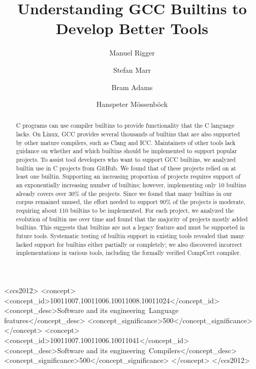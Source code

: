 \documentclass[sigconf,screen]{acmart}
\newcommand\tenbuiltinssupportapproxpercprojects{30\%} %
\begin{document}
\author{Manuel Rigger}


\author{Stefan Marr}

\author{Bram Adams}

\author{Hanspeter Mössenböck}

\title{Understanding GCC Builtins to Develop Better Tools}

\begin{abstract}
    C programs can use compiler builtins to provide functionality that the C language lacks.
    On Linux, GCC provides several thousands of builtins that are also supported by other mature compilers, such as Clang and ICC.
    Maintainers of other tools lack guidance on whether and which builtins should be implemented to support popular projects.
    To assist tool developers who want to support GCC builtins, we analyzed builtin use in \nrProjects{} C projects from GitHub.
    We found that \percentageProjectsWithBuiltins{} of these projects relied on at least one builtin.
    Supporting an increasing proportion of projects requires support of an exponentially increasing number of builtins; however, implementing only 10 builtins already covers over \tenbuiltinssupportapproxpercprojects{} of the projects.
    Since we found that many builtins in our corpus remained unused, the effort needed to support 90\% of the projects is moderate, requiring about 110 builtins to be implemented.
    For each project, we analyzed the evolution of builtin use over time and found that the majority of projects mostly added builtins.
    This suggests that builtins are not a legacy feature and must be supported in future tools.
    Systematic testing of builtin support in existing tools revealed that many lacked support for builtins either partially or completely; we also discovered incorrect implementations in various tools, including the formally verified CompCert compiler.
\end{abstract}

\begin{CCSXML}
<ccs2012>
<concept>
<concept_id>10011007.10011006.10011008.10011024</concept_id>
<concept_desc>Software and its engineering~Language features</concept_desc>
<concept_significance>500</concept_significance>
</concept>
<concept>
<concept_id>10011007.10011006.10011041</concept_id>
<concept_desc>Software and its engineering~Compilers</concept_desc>
<concept_significance>500</concept_significance>
</concept>
</ccs2012>
\end{CCSXML}
\end{document}
